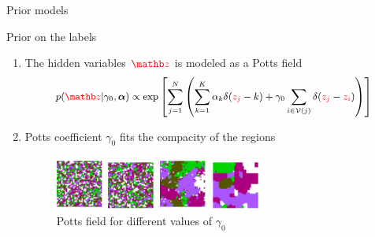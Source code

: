 \documentclass[latex]{beamer}
\def\beq{\[} \def\eeq{\]}
\begin{document}
\begin{frame}{Prior models}
\begin{block}{Prior on the labels}
\begin{enumerate}
\item The hidden variables $\red{\zb}$ is modeled as a Potts field 
\beq
\small
p(\rzb|\gamma_0, \alphab)\propto\exp{\left[\sum_{j=1}^{N} \left(\sum_{k=1}^{K} \alpha_k \delta(\red{z_j}-k)+\gamma_0 \sum_{i\in\Vc(j)}\delta(\red{z_j}-\red{z_i})\right)\right]}
\eeq
\item Potts coefficient $\gamma_0$ fits the compacity of the regions
\begin{figure}
 \begin{minipage}[htb]{0.24\linewidth}
  \centering
  \includegraphics[scale=1.5]{LabelsGamma0point5K5}
  \caption*{$\gamma_0=0.5$}
 \end{minipage} \hfill
 \begin{minipage}[htb]{0.24\linewidth}
  \centering
  \includegraphics[scale=1.5]{LabelsGamma0point7K5}
  \caption*{$\gamma_0=0.7$}
 \end{minipage} \hfill
 \begin{minipage}[htb]{0.24\linewidth}
  \centering
  \includegraphics[scale=1.5]{LabelsGamma0point8K5}
  \caption*{$\gamma_0=0.8$}
 \end{minipage} \hfill
 \begin{minipage}[htb]{0.24\linewidth}
  \centering
  \includegraphics[scale=1.5]{LabelsGamma1point6K5}
  \caption*{$\gamma_0=1.6$}
 \end{minipage} 
 \caption{Potts field for different values of $\gamma_0$}
 \label{fig:Potts field for different values of gamma_0}
\end{figure}
\end{enumerate}
\end{block}
\end{frame}
\end{document}
